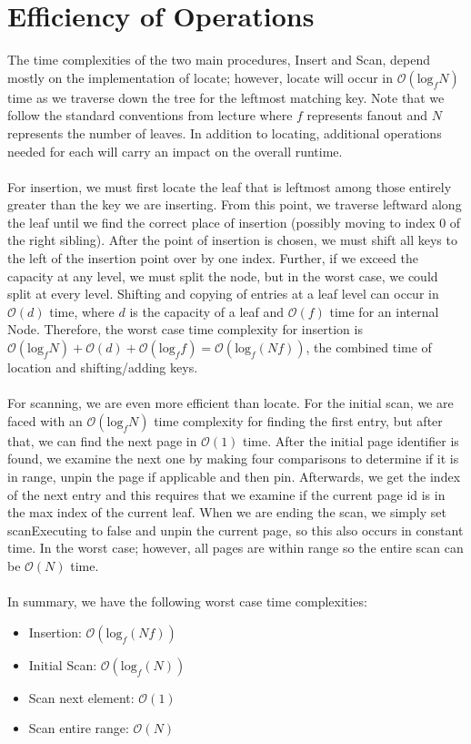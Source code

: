 \documentclass{article}
\begin{document}
\section*{Efficiency of Operations}
The time complexities of the two main procedures, Insert and Scan, depend mostly on the implementation of locate; however, locate will occur in \(\mathcal{O}(\textrm{log}_{f} N)\) time as we traverse down the tree for the leftmost matching key. Note that we follow the standard conventions from lecture where \(f\) represents fanout and \(N\) represents the number of leaves. In addition to locating, additional operations needed for each will carry an impact on the overall runtime.
\\\\
For insertion, we must first locate the leaf that is leftmost among those entirely greater than the key we are inserting. From this point, we traverse leftward along the leaf until we find the correct place of insertion (possibly moving to index 0 of the right sibling). After the point of insertion is chosen, we must shift all keys to the left of the insertion point over by one index. Further, if we exceed the capacity at any level, we must split the node, but in the worst case, we could split at every level. Shifting and copying of entries at a leaf level can occur in \(\mathcal{O}(d)\) time, where \(d\) is the capacity of a leaf and \(\mathcal{O}(f)\) time for an internal Node. Therefore, the worst case time complexity for insertion is \(\mathcal{O}(\textrm{log}_{f} N) + \mathcal{O}(d) + \mathcal{O}(\textrm{log}_{f} f) = \mathcal{O}(\textrm{log}_{f} (Nf))\), the combined time of location and shifting/adding keys.
\\\\
For scanning, we are even more efficient than locate. For the initial scan, we are faced with an \(\mathcal{O}(\textrm{log}_{f} N)\) time complexity for finding the first entry, but after that, we can find the next page in \(\mathcal{O}(1)\) time. After the initial page identifier is found, we examine the next one by making four comparisons to determine if it is in range, unpin the page if applicable and then pin. Afterwards, we get the index of the next entry and this requires that we examine if the current page id is in the max index of the current leaf. When we are ending the scan, we simply set scanExecuting to false and unpin the current page, so this also occurs in constant time. In the worst case; however, all pages are within range so the entire scan can be \(\mathcal{O}(N)\) time. 
\\\\
In summary, we have the following worst case time complexities:\begin{itemize}
    \item Insertion: \(\mathcal{O}(\textrm{log}_{f} (Nf))\)
    \item Initial Scan:  \(\mathcal{O}(\textrm{log}_{f}(N))\)
    \item Scan next element: \(\mathcal{O}(1)\)
    \item Scan entire range: \(\mathcal{O}(N)\)
    \end{itemize}
\end{document}
